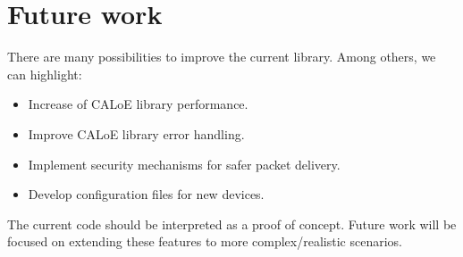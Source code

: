 \section{Future work}

There are many possibilities to improve the current library. Among others, we can highlight:

\begin{itemize}
 \item {Increase of CALoE library performance.}
 \item {Improve CALoE library error handling.}
 \item {Implement security mechanisms for safer packet delivery.}
 \item {Develop configuration files for new devices.}
\end{itemize}

The current code should be interpreted as a proof of concept. 
Future work will be focused on extending these features to more complex/realistic scenarios.  
